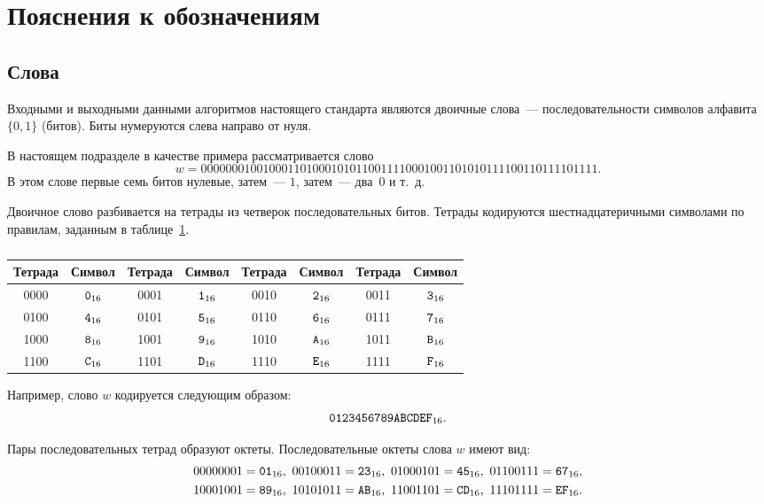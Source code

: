 \section{Пояснения к обозначениям}

\subsection{Слова}

Входными и выходными данными алгоритмов настоящего стандарта 
являются двоичные слова~--- последовательности символов 
алфавита~$\{0,1\}$ (битов). Биты нумеруются слева направо от нуля.

В настоящем подразделе в качестве примера рассматривается слово
$$
w=
0000 0001 0010 0011 0100 0101 0110 0111
1000 1001 1010 1011 1100 1101 1110 1111.
$$
В этом слове первые семь битов нулевые, затем~--- $1$, затем~--- два~$0$ и 
т.~д.

Двоичное слово разбивается на тетрады из четверок последовательных битов.
%
Тетрады кодируются шестнадцатеричными символами по правилам,
заданным в таблице~\ref{Table.Hex}.

\begin{table}[H]
\caption{}\label{Table.Hex}
\begin{tabular}{|c|c||c|c||c|c||c|c|}
\hline
Тетрада & Символ & Тетрада & Символ & 
Тетрада & Символ & Тетрада & Символ\\
\hline
0000 & $\texttt{0}_{16}$ & 0001 & $\texttt{1}_{16}$ & 
0010 & $\texttt{2}_{16}$ & 0011 & $\texttt{3}_{16}$\\
0100 & $\texttt{4}_{16}$ & 0101 & $\texttt{5}_{16}$ & 
0110 & $\texttt{6}_{16}$ & 0111 & $\texttt{7}_{16}$\\ 
1000 & $\texttt{8}_{16}$ & 1001 & $\texttt{9}_{16}$ & 
1010 & $\texttt{A}_{16}$ & 1011 & $\texttt{B}_{16}$\\ 
1100 & $\texttt{C}_{16}$ & 1101 & $\texttt{D}_{16}$ & 
1110 & $\texttt{E}_{16}$ & 1111 & $\texttt{F}_{16}$\\ 
\hline
\end{tabular}
\end{table}

Например, слово $w$ кодируется следующим образом:
$$
\texttt{0123456789ABCDEF}_{16}.
$$

Пары последовательных тетрад образуют октеты.
Последовательные октеты слова $w$ имеют вид:
\begin{align*}
&
0000 0001=\hex{01},\ 
0010 0011=\hex{23},\ 
0100 0101=\hex{45},\  
0110 0111=\hex{67},\\
%
&
1000 1001=\hex{89},\ 
1010 1011=\hex{AB},\ 
1100 1101=\hex{CD},\ 
1110 1111=\hex{EF}.
\end{align*}

